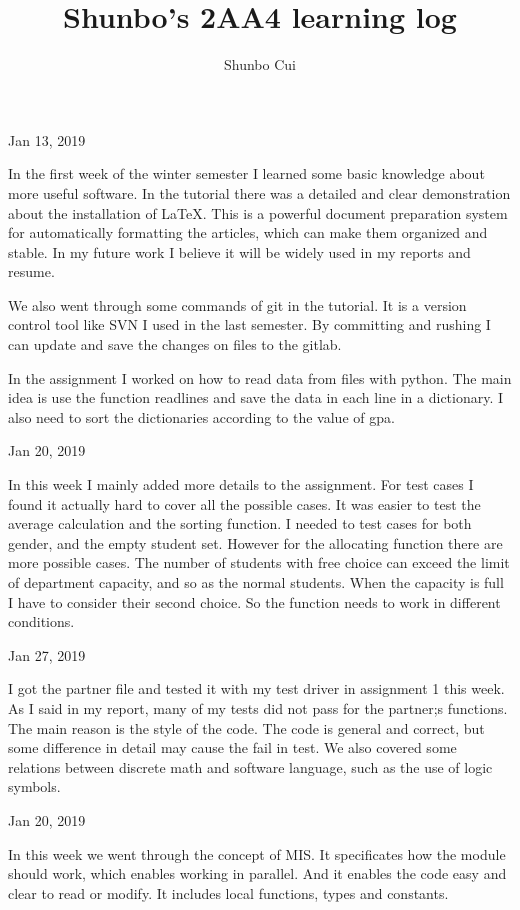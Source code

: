 \documentclass{article}
\title{Shunbo's 2AA4 learning log}
\author{Shunbo Cui}
\date{}
\begin{document}
\maketitle

\begin{flushleft}
Jan 13, 2019
\end{flushleft}
\par
In the first week of the winter semester I learned some basic knowledge about more useful software. In the tutorial there was a detailed and clear demonstration about the installation of LaTeX. This is a powerful document preparation system for automatically formatting the articles, which can make them organized and stable. In my future work I believe it will be widely used in my reports and resume.  \par
We also went through some commands of git in the tutorial. It is a version control tool like SVN I used in the last semester. By committing and rushing I can update and save the changes on files to the gitlab.\par
In the assignment I worked on how to read data from files with python. The main idea is use the function readlines and save the data in each line in a dictionary. I also need to sort the dictionaries according to the value of gpa.

\begin{flushleft}
Jan 20, 2019
\end{flushleft}
\par
In this week I mainly added more details to the assignment. For test cases I found it actually hard to cover all the possible cases. It was easier to test the average calculation and the sorting function. I needed to test cases for both gender, and the empty student set. However for the allocating function there are more possible cases. The number of students with free choice can exceed the limit of department capacity, and so as the normal students. When the capacity is full I have to consider their second choice. So the function needs to work in different conditions.\par

\begin{flushleft}
Jan 27, 2019
\end{flushleft}
\par
I got the partner file and tested it with my test driver in assignment 1 this week. As I said in my report, many of my tests did not pass for the partner;s functions. The main reason is the style of the code. The code is general and correct, but some difference in detail may cause the fail in test. We also covered some relations between discrete math and software language, such as the use of logic symbols.\par

\begin{flushleft}
Jan 20, 2019
\end{flushleft}
\par
In this week we went through the concept of MIS. It specificates how the module should work, which enables working in parallel. And it enables the code easy and clear to read or modify. It includes local functions, types and constants. 
\end{document}

